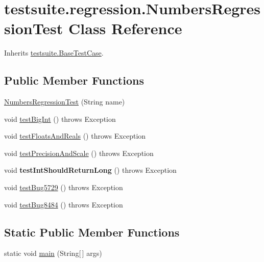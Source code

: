 \hypertarget{classtestsuite_1_1regression_1_1_numbers_regression_test}{}\section{testsuite.\+regression.\+Numbers\+Regression\+Test Class Reference}
\label{classtestsuite_1_1regression_1_1_numbers_regression_test}


Inherits \mbox{\hyperlink{classtestsuite_1_1_base_test_case}{testsuite.\+Base\+Test\+Case}}.

\subsection*{Public Member Functions}
\begin{DoxyCompactItemize}
\item 
\mbox{\hyperlink{classtestsuite_1_1regression_1_1_numbers_regression_test_a4f4ebba6f0961c6042cab7caf78d1247}{Numbers\+Regression\+Test}} (String name)
\item 
void \mbox{\hyperlink{classtestsuite_1_1regression_1_1_numbers_regression_test_a442fb6acce36ae3342c30c04bac684df}{test\+Big\+Int}} ()  throws Exception 
\item 
void \mbox{\hyperlink{classtestsuite_1_1regression_1_1_numbers_regression_test_a1cee824b008e722d36c7d179fb3774d0}{test\+Floats\+And\+Reals}} ()  throws Exception 
\item 
void \mbox{\hyperlink{classtestsuite_1_1regression_1_1_numbers_regression_test_aad8beaba829a493efd49381a817144b9}{test\+Precision\+And\+Scale}} ()  throws Exception 
\item 
\mbox{\label{classtestsuite_1_1regression_1_1_numbers_regression_test_ab804942f92985dc6aef8d3c368368e52}} 
void {\bfseries test\+Int\+Should\+Return\+Long} ()  throws Exception 
\item 
void \mbox{\hyperlink{classtestsuite_1_1regression_1_1_numbers_regression_test_a8b734d31cfe73a510c1e2c9a5f2d049f}{test\+Bug5729}} ()  throws Exception 
\item 
void \mbox{\hyperlink{classtestsuite_1_1regression_1_1_numbers_regression_test_a28ea888d744588001519dd5cafde7074}{test\+Bug8484}} ()  throws Exception 
\end{DoxyCompactItemize}
\subsection*{Static Public Member Functions}
\begin{DoxyCompactItemize}
\item 
static void \mbox{\hyperlink{classtestsuite_1_1regression_1_1_numbers_regression_test_a76a80229b5821f90dff89a1d63388e41}{main}} (String\mbox{[}$\,$\mbox{]} args)
\end{DoxyCompactItemize}
